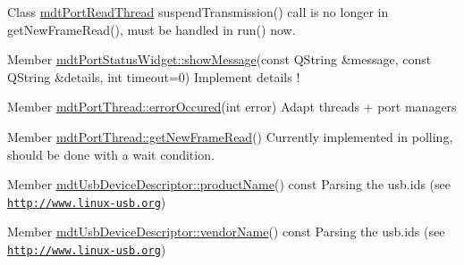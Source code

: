 \label{todo__todo000025}
\hypertarget{todo__todo000025}{}
 
\begin{DoxyDescription}
\item[Class \hyperlink{classmdt_port_read_thread}{mdtPortReadThread} ]suspendTransmission() call is no longer in getNewFrameRead(), must be handled in run() now. 
\end{DoxyDescription}

\label{todo__todo000026}
\hypertarget{todo__todo000026}{}
 
\begin{DoxyDescription}
\item[Member \hyperlink{classmdt_port_status_widget_a8fce28ddb290512f5681cf800ac17b81}{mdtPortStatusWidget::showMessage}(const QString \&message, const QString \&details, int timeout=0) ]Implement details ! 
\end{DoxyDescription}

\label{todo__todo000027}
\hypertarget{todo__todo000027}{}
 
\begin{DoxyDescription}
\item[Member \hyperlink{classmdt_port_thread_ab31cbe1a85aa830cd368654d1f806326}{mdtPortThread::errorOccured}(int error) ]Adapt threads + port managers
\end{DoxyDescription}

\label{todo__todo000028}
\hypertarget{todo__todo000028}{}
 
\begin{DoxyDescription}
\item[Member \hyperlink{classmdt_port_thread_a611211e56620ec9c699019452716e4fc}{mdtPortThread::getNewFrameRead}() ]Currently implemented in polling, should be done with a wait condition.
\end{DoxyDescription}

\label{todo__todo000031}
\hypertarget{todo__todo000031}{}
 
\begin{DoxyDescription}
\item[Member \hyperlink{classmdt_usb_device_descriptor_a626afc71d8e72600f12259ac6f5a5866}{mdtUsbDeviceDescriptor::productName}() const  ]Parsing the usb.ids (see \href{http://www.linux-usb.org}{\tt http://www.linux-\/usb.org}) 
\end{DoxyDescription}

\label{todo__todo000030}
\hypertarget{todo__todo000030}{}
 
\begin{DoxyDescription}
\item[Member \hyperlink{classmdt_usb_device_descriptor_ac2f746ebd5540b65bf00f82c991f5c3b}{mdtUsbDeviceDescriptor::vendorName}() const  ]Parsing the usb.ids (see \href{http://www.linux-usb.org}{\tt http://www.linux-\/usb.org}) 
\end{DoxyDescription}

